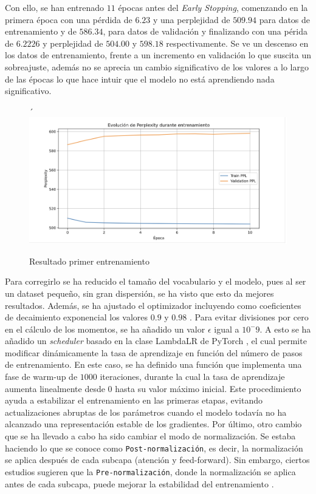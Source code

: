 \documentclass[11pt]{book}
\theoremstyle{plain}
\theoremstyle{definition}
\begin{document}
Con ello, se han entrenado $11$ épocas antes del \textit{Early Stopping}, comenzando en la primera época con una pérdida de $6.23$ y una perplejidad de  $509.94$ para datos de entrenamiento y de $586.34$, para datos de validación y finalizando con una périda de $6.2226$ y perplejidad de $504.00$ y $598.18$ respectivamente. Se ve un descenso en los datos de entrenamiento, frente a un incremento en validación lo que suscita un sobreajuste, además no se aprecia un cambio significativo de los valores a lo largo de las épocas lo que hace intuir que el modelo no está aprendiendo nada significativo.

\begin{figure}[h]
    \centering´
    \includegraphics[width=0.5\linewidth]{img/resultado_entrenamiento_v1.png}
    \caption{Resultado primer entrenamiento}
    \label{fig:placeholder24}
\end{figure}

Para corregirlo se ha reducido el tamaño del vocabulario y el modelo, pues al ser un dataset pequeño, sin gran dispersión, se ha visto que esto da mejores resultados. Además, se ha ajustado el optimizador incluyendo como coeficientes de decaimiento exponencial los valores $0.9$ y $0.98$ \parencite{reddit_transformer_not_learning}. Para evitar divisiones por cero en el cálculo de los momentos, se ha añadido un valor $\epsilon$ igual a $10^-9$. A esto se ha añadido un \textit{scheduler} basado en la clase LambdaLR de PyTorch \parencite{pytorch_adjust_lr}, el cual permite modificar dinámicamente la tasa de aprendizaje en función del número de pasos de entrenamiento. En este caso, se ha definido una función que implementa una fase de warm-up de $1000$ iteraciones, durante la cual la tasa de aprendizaje aumenta linealmente desde 0 hasta su valor máximo inicial. Este procedimiento ayuda a estabilizar el entrenamiento en las primeras etapas, evitando actualizaciones abruptas de los parámetros cuando el modelo todavía no ha alcanzado una representación estable de los gradientes. Por último, otro cambio que se ha llevado a cabo ha sido cambiar el modo de normalización. Se estaba haciendo lo que se conoce como \texttt{Post-normalización}, es decir, la normalización se aplica después de cada subcapa (atención y feed-forward). Sin embargo, ciertos estudios sugieren que la \texttt{Pre-normalización}, donde la normalización se aplica antes de cada subcapa, puede mejorar la estabilidad del entrenamiento \parencite{doherty2024_hownot}.
\end{document}
